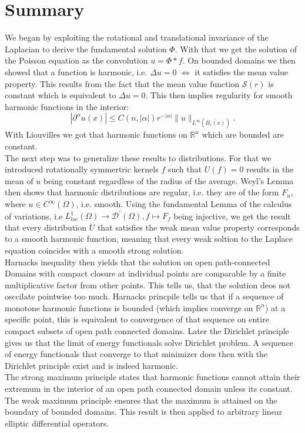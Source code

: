 \documentclass[A4,12pt,twoside]{book}
\begin{document}
\section{Summary}
We began by exploiting the rotational and translational invariance of the Laplacian to derive the fundamental solution $\Phi$. With that we get the solution of the Poisson equation as the convolution $u = \Phi * f$. On bounded domains we then showed that a function is harmonic, i.e. $\Delta u =0$ $\iff$ it satisfies the mean value property. This results from the fact that the mean value function $\mathcal{S}(r)$ is constant which is equivalent to $\Delta u=0$. This then implies regularity for smooth harmonic functions in the interior: 
    \[
    |\partial^\alpha u(x)| \leq C(n,|\alpha|) r^{- |\alpha|} \| u \|_{L^\infty (\overline{B_r(x)})}.
    \]
    With Liouvilles we got that harmonic functions on $\mathbb{R}^n$ which are bounded are constant.\\
    The next step was to generalize these results to distributions. For that we introduced rotationally symmertric kernels $f$ such that $U (f)=0$ results in the mean of $u$ being constant regardless of the radius of the average. Weyl's Lemma then shows that harmonic distributions are regular, i.e. they are of the form $F_u$, where $u \in C^\infty (\Omega)$, i.e. smooth. Using the fundamental Lemma of the calculus of variations, i.e $L_{loc}^1(\Omega)\to \mathcal{D}^\prime (\Omega), f \mapsto F_f$ being injective, we get the result that every distribution $U$ that satisfies the weak mean value property corresponds to a smooth harmonic function, meaning that every weak soltion to the Laplace equation coincides with a smooth strong solution.\\
    Harnacks inequality then yields that the solution on open path-connected Domains with compact closure at individual points are comparable by a finite multiplicative factor from other points. This tells us, that the solution deos not osccilate pointwise too much. Harnacks princpile tells us that if a sequence of monotone harmonic functions is bounded (which implies converge on $\mathbb{R}^n$) at a specific point, this is equivalent to convergence of that sequence on entire compact subsets of open path connected domains. Later the Dirichlet principle gives us that the limit of energy functionals solve Dirichlet problem. A sequence of energy functionals that converge to that minimizer does then with the Dirichlet principle exist and is indeed harmonic.\\
    The strong maximum principle states that harmonic functions cannot attain their extremum in the interior of an open path connected domain unless its constant. The weak maximum principle ensures that the maximum is attained on the boundary of bounded domains. This result is then applied to arbitrary linear elliptic differential operators.\\
\end{document}
